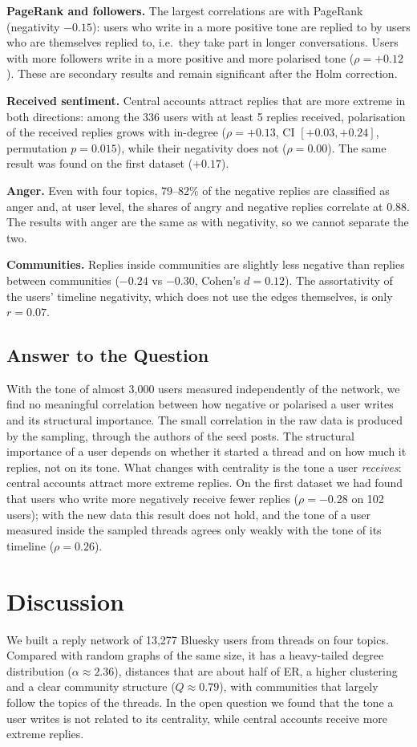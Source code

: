 \documentclass[sigchi]{acmart}
\begin{document}
\textbf{PageRank and followers.} The largest correlations are with PageRank (negativity $-0.15$): users who write in a more positive tone are replied to by users who are themselves replied to, i.e.\ they take part in longer conversations. Users with more followers write in a more positive and more polarised tone ($\rho=+0.12$). These are secondary results and remain significant after the Holm correction.

\textbf{Received sentiment.} Central accounts attract replies that are more extreme in both directions: among the 336 users with at least 5 replies received, polarisation of the received replies grows with in-degree ($\rho=+0.13$, CI $[+0.03, +0.24]$, permutation $p=0.015$), while their negativity does not ($\rho=0.00$). The same result was found on the first dataset ($+0.17$).

\textbf{Anger.} Even with four topics, 79--82\% of the negative replies are classified as anger and, at user level, the shares of angry and negative replies correlate at 0.88. The results with anger are the same as with negativity, so we cannot separate the two.

\textbf{Communities.} Replies inside communities are slightly less negative than replies between communities ($-0.24$ vs $-0.30$, Cohen's $d=0.12$). The assortativity of the users' timeline negativity, which does not use the edges themselves, is only $r=0.07$.

\subsection{Answer to the Question}
With the tone of almost 3,000 users measured independently of the network, we find no meaningful correlation between how negative or polarised a user writes and its structural importance. The small correlation in the raw data is produced by the sampling, through the authors of the seed posts. The structural importance of a user depends on whether it started a thread and on how much it replies, not on its tone. What changes with centrality is the tone a user \emph{receives}: central accounts attract more extreme replies. On the first dataset we had found that users who write more negatively receive fewer replies ($\rho=-0.28$ on 102 users); with the new data this result does not hold, and the tone of a user measured inside the sampled threads agrees only weakly with the tone of its timeline ($\rho=0.26$).

\section{Discussion}
We built a reply network of 13,277 Bluesky users from threads on four topics. Compared with random graphs of the same size, it has a heavy-tailed degree distribution ($\alpha \approx 2.36$), distances that are about half of ER, a higher clustering and a clear community structure ($Q \approx 0.79$), with communities that largely follow the topics of the threads. In the open question we found that the tone a user writes is not related to its centrality, while central accounts receive more extreme replies.
\end{document}
